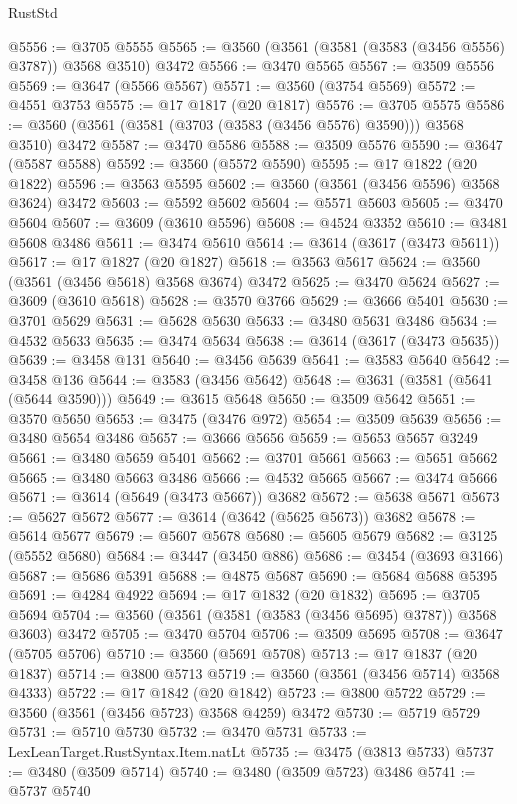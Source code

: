 \begin{lexlean}{RustStd}
\begin{coremodule}
{\begin{coremodule}
{{{{{{{{{{{{{{{{{{{{{{{{{{{{{{{{{{{{{{{{{{{{{@5556 := @3705 @5555
@5565 := @3560 (@3561 (@3581 (@3583 (@3456 @5556) @3787)) @3568 @3510) @3472
@5566 := @3470 @5565
@5567 := @3509 @5556
@5569 := @3647 (@5566 @5567)
@5571 := @3560 (@3754 @5569)
@5572 := @4551 @3753
@5575 := @17 @1817 (@20 @1817)
@5576 := @3705 @5575
@5586 := @3560 (@3561 (@3581 (@3703 (@3583 (@3456 @5576) @3590))) @3568 @3510) @3472
@5587 := @3470 @5586
@5588 := @3509 @5576
@5590 := @3647 (@5587 @5588)
@5592 := @3560 (@5572 @5590)
@5595 := @17 @1822 (@20 @1822)
@5596 := @3563 @5595
@5602 := @3560 (@3561 (@3456 @5596) @3568 @3624) @3472
@5603 := @5592 @5602
@5604 := @5571 @5603
@5605 := @3470 @5604
@5607 := @3609 (@3610 @5596)
@5608 := @4524 @3352
@5610 := @3481 @5608 @3486
@5611 := @3474 @5610
@5614 := @3614 (@3617 (@3473 @5611))
@5617 := @17 @1827 (@20 @1827)
@5618 := @3563 @5617
@5624 := @3560 (@3561 (@3456 @5618) @3568 @3674) @3472
@5625 := @3470 @5624
@5627 := @3609 (@3610 @5618)
@5628 := @3570 @3766
@5629 := @3666 @5401
@5630 := @3701 @5629
@5631 := @5628 @5630
@5633 := @3480 @5631 @3486
@5634 := @4532 @5633
@5635 := @3474 @5634
@5638 := @3614 (@3617 (@3473 @5635))
@5639 := @3458 @131
@5640 := @3456 @5639
@5641 := @3583 @5640
@5642 := @3458 @136
@5644 := @3583 (@3456 @5642)
@5648 := @3631 (@3581 (@5641 (@5644 @3590)))
@5649 := @3615 @5648
@5650 := @3509 @5642
@5651 := @3570 @5650
@5653 := @3475 (@3476 @972)
@5654 := @3509 @5639
@5656 := @3480 @5654 @3486
@5657 := @3666 @5656
@5659 := @5653 @5657 @3249
@5661 := @3480 @5659 @5401
@5662 := @3701 @5661
@5663 := @5651 @5662
@5665 := @3480 @5663 @3486
@5666 := @4532 @5665
@5667 := @3474 @5666
@5671 := @3614 (@5649 (@3473 @5667)) @3682
@5672 := @5638 @5671
@5673 := @5627 @5672
@5677 := @3614 (@3642 (@5625 @5673)) @3682
@5678 := @5614 @5677
@5679 := @5607 @5678
@5680 := @5605 @5679
@5682 := @3125 (@5552 @5680)
@5684 := @3447 (@3450 @886)
@5686 := @3454 (@3693 @3166)
@5687 := @5686 @5391
@5688 := @4875 @5687
@5690 := @5684 @5688 @5395
@5691 := @4284 @4922
@5694 := @17 @1832 (@20 @1832)
@5695 := @3705 @5694
@5704 := @3560 (@3561 (@3581 (@3583 (@3456 @5695) @3787)) @3568 @3603) @3472
@5705 := @3470 @5704
@5706 := @3509 @5695
@5708 := @3647 (@5705 @5706)
@5710 := @3560 (@5691 @5708)
@5713 := @17 @1837 (@20 @1837)
@5714 := @3800 @5713
@5719 := @3560 (@3561 (@3456 @5714) @3568 @4333)
@5722 := @17 @1842 (@20 @1842)
@5723 := @3800 @5722
@5729 := @3560 (@3561 (@3456 @5723) @3568 @4259) @3472
@5730 := @5719 @5729
@5731 := @5710 @5730
@5732 := @3470 @5731
@5733 := LexLeanTarget.RustSyntax.Item.natLt
@5735 := @3475 (@3813 @5733)
@5737 := @3480 (@3509 @5714)
@5740 := @3480 (@3509 @5723) @3486
@5741 := @5737 @5740
}}}}}}}}}}}}}}}}}}}}}}}}}}}}}}}}}}}}}}}}}}}}}
\end{coremodule}}
\end{coremodule}
\end{lexlean}
